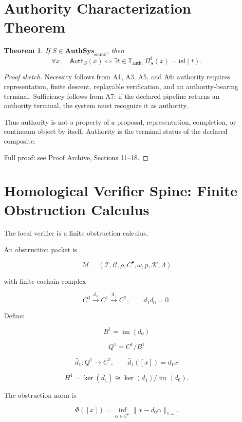 \documentclass[11pt]{article}
\newtheorem{theorem}{Theorem}[section]
\begin{document}
\section{Authority Characterization Theorem}

\begin{theorem} \label{thm:auth_char}
If \(S\in\mathbf{AuthSys}_{\mathrm{sound}}\), then
\[
\boxed{
\forall x,\quad
\mathsf{Auth}_S(x)
\iff
\exists t\in\mathbb T_{\mathsf{auth}},
\Pi_S^\sharp(x)=\mathsf{inl}(t).
}
\]
\end{theorem}

\begin{proof}[Proof sketch]
Necessity follows from A1, A3, A5, and A6: authority requires representation, finite descent, replayable verification, and an authority-bearing terminal. Sufficiency follows from A7: if the declared pipeline returns an authority terminal, the system must recognize it as authority.

Thus authority is not a property of a proposal, representation, completion, or continuum object by itself. Authority is the terminal status of the declared composite.

Full proof: see Proof Archive, Sections 11--18.
\end{proof}

\section{Homological Verifier Spine: Finite Obstruction Calculus}

The local verifier is a finite obstruction calculus.

An obstruction packet is

\[
\mathcal M
=
(
\mathcal T,
\mathcal C,
\rho,
C^\bullet,
\omega,
p,
\mathcal K,
\Lambda
)
\]

with finite cochain complex

\[
\boxed{
C^0\xrightarrow{d_0}C^1\xrightarrow{d_1}C^2,
\qquad d_1d_0=0.
}
\]

Define:

\[
B^1=\operatorname{im}(d_0)
\]

\[
Q^1=C^1/B^1
\]

\[
\bar d_1:Q^1\to C^2,
\qquad
\bar d_1([x])=d_1x
\]

\[
H^1=\ker(\bar d_1)\cong\ker(d_1)/\operatorname{im}(d_0).
\]

The obstruction norm is

\[
\boxed{
\Phi([x])=
\inf_{\alpha\in C^0}\|x-d_0\alpha\|_{1,\omega}.
}
\]
\end{document}
